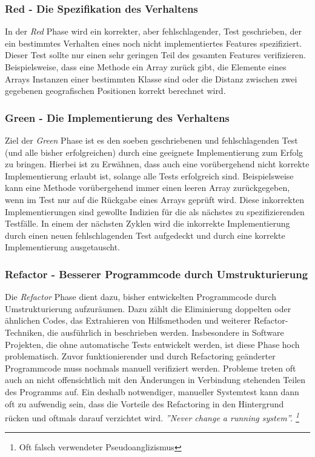 \subsubsection{Red - Die Spezifikation des Verhaltens}

In der \textit{Red} Phase wird ein korrekter, aber fehlschlagender,
Test geschrieben, der ein bestimmtes Verhalten eines noch nicht
implementiertes Features spezifiziert. Dieser Test sollte nur einen
sehr geringen Teil des gesamten Features
verifizieren. Beispielsweise, dass eine Methode ein Array zurück gibt,
die Elemente eines Arrays Instanzen einer bestimmten Klasse sind oder
die Distanz zwischen zwei gegebenen geografischen Positionen korrekt
berechnet wird.

\subsubsection{Green - Die Implementierung des Verhaltens}

Ziel der \textit{Green} Phase ist es den soeben geschriebenen und
fehlschlagenden Test (und alle bisher erfolgreichen) durch eine
geeignete Implementierung zum Erfolg zu bringen. Hierbei ist zu
Erwähnen, dass auch eine vorübergehend nicht korrekte Implementierung
erlaubt ist, solange alle Tests erfolgreich sind. Beispielsweise kann
eine Methode vorübergehend immer einen leeren Array zurückgegeben,
wenn im Test nur auf die Rückgabe eines Arrays geprüft wird. Diese
inkorrekten Implementierungen sind gewollte Indizien für die als
nächstes zu spezifizierenden Testfälle. In einem der nächsten Zyklen
wird die inkorrekte Implementierung durch einen neuen fehlschlagenden
Test aufgedeckt und durch eine korrekte Implementierung ausgetauscht.

\subsubsection{Refactor - Besserer Programmcode durch
  Umstrukturierung}

Die \textit{Refactor} Phase dient dazu, bisher entwickelten
Programmcode durch Umstrukturierung aufzuräumen. Dazu zählt die
Eliminierung doppelten oder ähnlichen Codes, das Extrahieren von
Hilfsmethoden und weiterer Refactor-Techniken, die ausführlich in
\cite{fowler99refactoring} beschrieben werden. Insbesondere in
Software Projekten, die ohne automatische Tests entwickelt werden, ist
diese Phase hoch problematisch. Zuvor funktionierender und durch
Refactoring geänderter Programmcode muss nochmals manuell verifiziert
werden. Probleme treten oft auch an nicht offensichtlich mit den
Änderungen in Verbindung stehenden Teilen des Programms auf. Ein
deshalb notwendiger, manueller Systemtest kann dann oft zu aufwendig
sein, dass die Vorteile des Refactoring in den Hintergrund rücken und
oftmals darauf verzichtet wird.  \textit{''Never change a running
  system''. \footnote{Oft falsch verwendeter Pseudoanglizismus}}

